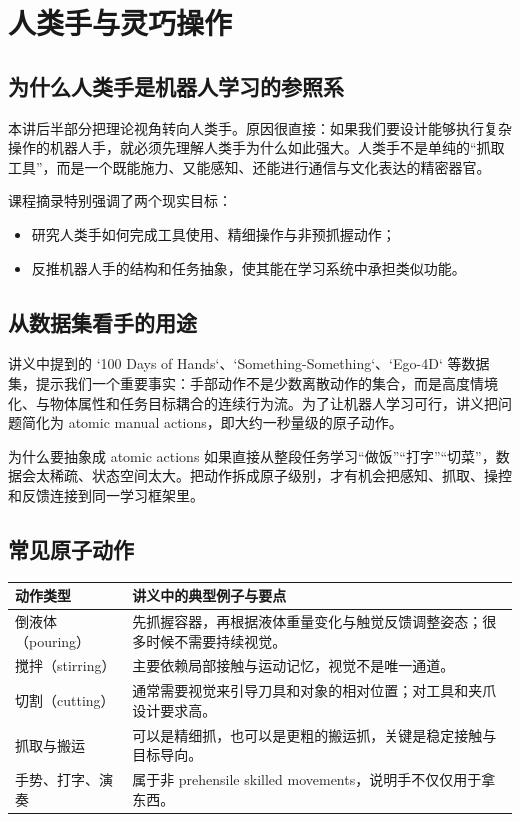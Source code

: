 \documentclass[a4paper]{article}
\begin{document}
\section{人类手与灵巧操作}

\subsection{为什么人类手是机器人学习的参照系}
本讲后半部分把理论视角转向人类手。原因很直接：如果我们要设计能够执行复杂操作的机器人手，就必须先理解人类手为什么如此强大。人类手不是单纯的“抓取工具”，而是一个既能施力、又能感知、还能进行通信与文化表达的精密器官。

课程摘录特别强调了两个现实目标：
\begin{itemize}
  \item 研究人类手如何完成工具使用、精细操作与非预抓握动作；
  \item 反推机器人手的结构和任务抽象，使其能在学习系统中承担类似功能。
\end{itemize}

\subsection{从数据集看手的用途}
讲义中提到的 `100 Days of Hands`、`Something-Something`、`Ego-4D` 等数据集，提示我们一个重要事实：手部动作不是少数离散动作的集合，而是高度情境化、与物体属性和任务目标耦合的连续行为流。为了让机器人学习可行，讲义把问题简化为 atomic manual actions，即大约一秒量级的原子动作。

\begin{importantbox}{为什么要抽象成 atomic actions}
如果直接从整段任务学习“做饭”“打字”“切菜”，数据会太稀疏、状态空间太大。把动作拆成原子级别，才有机会把感知、抓取、操控和反馈连接到同一学习框架里。
\end{importantbox}

\subsection{常见原子动作}
\begin{table}[H]
\centering
\begin{tabular}{p{}p{}}
\toprule
动作类型 & 讲义中的典型例子与要点 \\
\midrule
倒液体（pouring） & 先抓握容器，再根据液体重量变化与触觉反馈调整姿态；很多时候不需要持续视觉。 \\
搅拌（stirring） & 主要依赖局部接触与运动记忆，视觉不是唯一通道。 \\
切割（cutting） & 通常需要视觉来引导刀具和对象的相对位置；对工具和夹爪设计要求高。 \\
抓取与搬运 & 可以是精细抓，也可以是更粗的搬运抓，关键是稳定接触与目标导向。 \\
手势、打字、演奏 & 属于非 prehensile skilled movements，说明手不仅仅用于拿东西。 \\
\bottomrule
\end{tabular}
\end{table}
\end{document}
